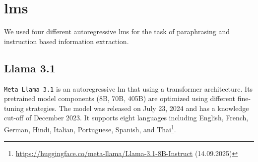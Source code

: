 \chapter{\acp{lm}}
\label{app:language_models}

We used four different autoregressive \acp{lm} for the task of paraphrasing and instruction based information extraction.

\begin{table}[h]
\centering
\caption{Collection of multilingual \acp{llm} used for paraphrasing\protect\footnotemark.}

\label{tab:llm_paraphrasers}
\end{table}

\section{Llama 3.1}

\texttt{Meta Llama 3.1} is an autoregressive \ac{lm} that using a transformer architecture.
Its pretrained model components  (8B, 70B, 405B) are optimized using different fine-tuning strategies.
The model was released on July 23, 2024 and has a knowledge cut-off of December 2023.
It supports eight languages including English, French, German, Hindi, Italian, Portuguese, Spanish, and Thai\footnote{\url{https://huggingface.co/meta-llama/Llama-3.1-8B-Instruct} (14.09.2025)}.


